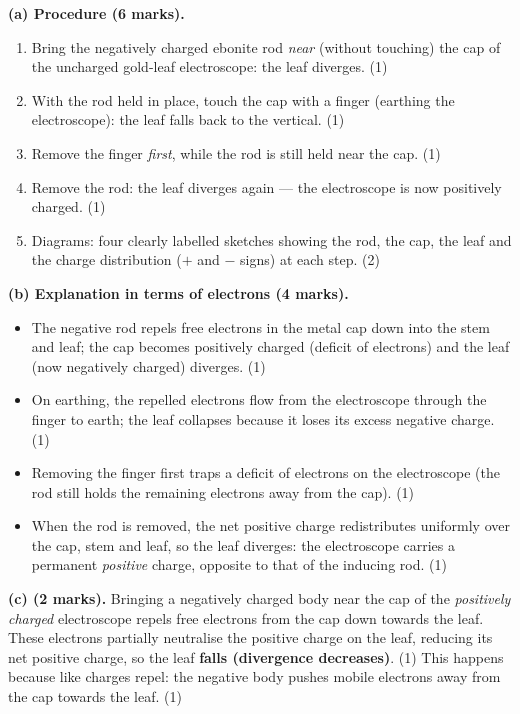 \documentclass[11pt]{article}
\begin{document}
\begin{corrige}
\textbf{(a) Procedure (6 marks).}
\begin{enumerate}
\item Bring the negatively charged ebonite rod \emph{near} (without touching) the cap of the uncharged gold-leaf electroscope: the leaf diverges. \hfill (1)
\item With the rod held in place, touch the cap with a finger (earthing the electroscope): the leaf falls back to the vertical. \hfill (1)
\item Remove the finger \emph{first}, while the rod is still held near the cap. \hfill (1)
\item Remove the rod: the leaf diverges again — the electroscope is now positively charged. \hfill (1)
\item Diagrams: four clearly labelled sketches showing the rod, the cap, the leaf and the charge distribution ($+$ and $-$ signs) at each step. \hfill (2)
\end{enumerate}
\textbf{(b) Explanation in terms of electrons (4 marks).}
\begin{itemize}
\item The negative rod repels free electrons in the metal cap down into the stem and leaf; the cap becomes positively charged (deficit of electrons) and the leaf (now negatively charged) diverges. \hfill (1)
\item On earthing, the repelled electrons flow from the electroscope through the finger to earth; the leaf collapses because it loses its excess negative charge. \hfill (1)
\item Removing the finger first traps a deficit of electrons on the electroscope (the rod still holds the remaining electrons away from the cap). \hfill (1)
\item When the rod is removed, the net positive charge redistributes uniformly over the cap, stem and leaf, so the leaf diverges: the electroscope carries a permanent \emph{positive} charge, opposite to that of the inducing rod. \hfill (1)
\end{itemize}
\textbf{(c) (2 marks).} Bringing a negatively charged body near the cap of the \emph{positively charged} electroscope repels free electrons from the cap down towards the leaf. These electrons partially neutralise the positive charge on the leaf, reducing its net positive charge, so the leaf \textbf{falls (divergence decreases)}. \hfill (1) This happens because like charges repel: the negative body pushes mobile electrons away from the cap towards the leaf. \hfill (1)
\end{corrige}
\end{document}

